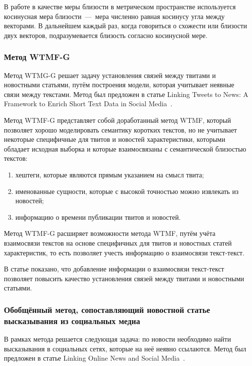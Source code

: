         В работе в качестве меры близости в метрическом пространстве используется косинусная мера близости~---~мера численно равная косинусу угла между векторами.
        В дальнейшем каждый раз, когда говориться о схожести или близости двух векторов, подразумевается близость согласно косинусной мере.

    \subsubsection{Метод WTMF-G}
        Метод WTMG-G решает задачу установления связей между твитами и новостными статьями, путём построения модели, которая учитывает неявные связи между текстами.
        Метод был предложен в статье Linking Tweets to News: A Framework to Enrich Short Text Data in Social Media~\cite{linking_base}.

        Метод WTMF-G представляет собой доработанный метод WTMF, который позволяет хорошо моделировать семантику коротких текстов,
        но не учитывает некоторые специфичные для твитов и новостей характеристики, которыми обладает исходная выборка и
        которые взаимосвязаны с семантической близостью текстов:
        \begin{enumerate}
            \item хештеги, которые являются прямым указанием на смысл твита;
            \item именованные сущности, которые с высокой точностью можно извлекать из новостей;
            \item информацию о времени публикации твитов и новостей.
        \end{enumerate}
        Метод WTMF-G расширяет возможности метода WTMF, путём учёта взаимосвязи текстов на основе специфичных для твитов и новостных статей характеристик,
        то есть позволяет учесть информацию о взаимосвязи текст-текст.

        В статье показано, что добавление информации о взаимосвязи текст-текст позволяет повысить качество установления связей между твитами и новостными статьями.

    \subsubsection{Обобщённый метод, сопоставляющий новостной статье высказывания из социальных медиа}
        В рамках метода решается следующая задача: по новости необходимо найти высказывания в социальных сетях, которые на неё неявно ссылаются.
        Метод был предложен в статье Linking Online News and Social Media~\cite{linking_news_media}.

